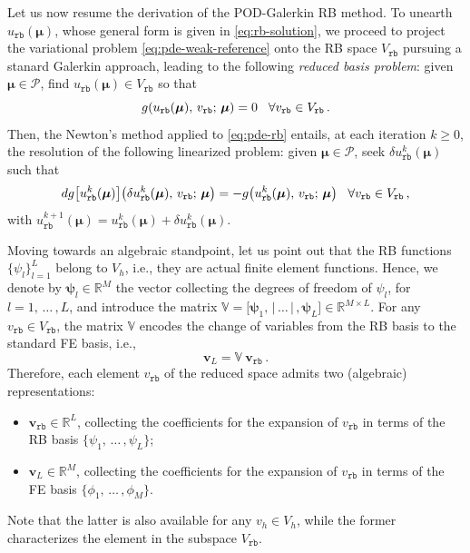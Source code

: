 \documentclass[12pt, a4paper, twoside, openright]{report}
\numberwithin{equation}{chapter}
\theoremstyle{theorem}
\theoremstyle{definition}
\theoremstyle{remark}
\theoremstyle{proposition}
\numberwithin{figure}{chapter}
\newcommand{\bg}[1]{\boldsymbol{#1}}
\begin{document}
		Let us now resume the derivation of the POD-Galerkin RB method. To unearth $u_{\texttt{rb}}(\bg{\mu})$, whose general form is given in \eqref{eq:rb-solution}, we proceed to project the variational problem \eqref{eq:pde-weak-reference} onto the RB space $V_{\texttt{rb}}$ pursuing a stanard Galerkin approach, leading to the following \emph{reduced basis problem}: given $\bg{\mu} \in \mathcal{P}$, find $u_{\texttt{rb}}(\bg{\mu}) \in V_{\texttt{rb}}$ so that
		\begin{equation}
			\label{eq:pde-rb}
			g(u_{\texttt{rb}}(\bg{\mu}), \, v_{\texttt{rb}}; \, \bg{\mu}) = 0 \hspace*{0.3cm} \forall v_{\texttt{rb}} \in V_{\texttt{rb}} \, .
		\end{equation}
		Then, the Newton's method applied to \eqref{eq:pde-rb} entails, at each iteration $k \geq 0$, the resolution of the following linearized problem: given $\bg{\mu} \in \mathcal{P}$, seek $\delta u_{\texttt{rb}}^k(\bg{\mu})$ such that
		\begin{equation}
			\label{eq:pde-rb-newton}
			dg \big[ u_{\texttt{rb}}^k(\bg{\mu}) \big] \big( \delta u_{\texttt{rb}}^k(\bg{\mu}), \, v_{\texttt{rb}}; \, \bg{\mu} \big) = - g \big( u_{\texttt{rb}}^k(\bg{\mu}), \, v_{\texttt{rb}}; \, \bg{\mu} \big) \hspace*{0.3cm} \forall v_{\texttt{rb}} \in V_{\texttt{rb}} \, ,
		\end{equation}
		with $u_{\texttt{rb}}^{k+1}(\bg{\mu}) = u_{\texttt{rb}}^k(\bg{\mu}) + \delta u_{\texttt{rb}}^k(\bg{\mu})$.
		
		Moving towards an algebraic standpoint, let us point out that the RB functions $\big\lbrace \psi_l \big\rbrace_{l = 1}^L$ belong to $V_h$, i.e., they are actual finite element functions. Hence, we denote by $\bg{\psi}_l \in \mathbb{R}^M$ the vector collecting the degrees of freedom of $\psi_l$, for $l = 1, \, \ldots \, , L$, and introduce the matrix $\mathbb{V} = \big[ \bg{\psi}_1, \, \big| \, \ldots \, \big| \, , \bg{\psi}_L \big] \in \mathbb{R}^{M \times L}$. For any $v_{\texttt{rb}} \in V_{\texttt{rb}}$, the matrix $\mathbb{V}$ encodes the change of variables from the RB basis to the standard FE basis, i.e.,
		\begin{equation}
			\label{eq:rb-fe-coefficients}
			\mathbf{v}_L = \mathbb{V} ~ \mathbf{v}_{\texttt{rb}} \, .
		\end{equation}
		Therefore, each element $v_{\texttt{rb}}$ of the reduced space admits two (algebraic) representations:
		\begin{itemize}
			\item $\mathbf{v}_{\texttt{rb}} \in \mathbb{R}^L$, collecting the coefficients for the expansion of $v_{\texttt{rb}}$ in terms of the RB basis $\big\lbrace \psi_1, \, \ldots \, , \psi_L \big\rbrace$;
			\item $\mathbf{v}_{L} \in \mathbb{R}^M$, collecting the coefficients for the expansion of $v_{\texttt{rb}}$ in terms of the FE basis $\big\lbrace \phi_1, \, \ldots \, , \phi_M \big\rbrace$.
		\end{itemize}
		Note that the latter is also available for any $v_h \in V_h$, while the former characterizes the element in the subspace $V_{\texttt{rb}}$.
		
\end{document}
